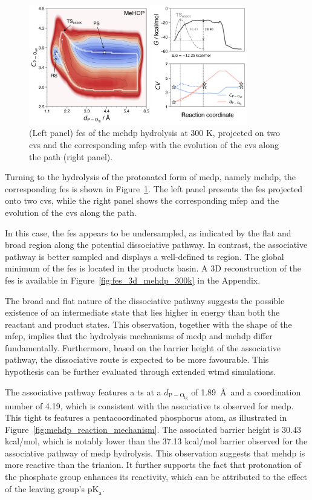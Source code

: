 \begin{figure}[b!]
\centering
\includegraphics[width=0.85\textwidth]{Figures/4_Results/results_MeHDP_300K_fes_mfep.png}
\caption{(Left panel) \ac{fes} of the \ac{mehdp} hydrolysis at 300 K, projected on two \acp{cv} and the corresponding \ac{mfep} with the evolution of the \acp{cv} along the path (right panel).}
\label{fig:mehdp_300k_fes_mfep}
\end{figure}

Turning to the hydrolysis of the protonated form of \ac{medp}, namely \ac{mehdp}, the corresponding \ac{fes} is shown in Figure~\ref{fig:mehdp_300k_fes_mfep}. The left panel presents the \ac{fes} projected onto two \acp{cv}, while the right panel shows the corresponding \ac{mfep} and the evolution of the \acp{cv} along the path.

In this case, the \ac{fes} appears to be undersampled, as indicated by the flat and broad region along the potential dissociative pathway. In contrast, the associative pathway is better sampled and displays a well-defined \ac{ts} region. The global minimum of the \ac{fes} is located in the products basin. A 3D reconstruction of the \ac{fes} is available in Figure~\ref{fig:fes_3d_mehdp_300k} in the Appendix.

The broad and flat nature of the dissociative pathway suggests the possible existence of an intermediate state that lies higher in energy than both the reactant and product states. This observation, together with the shape of the \ac{mfep}, implies that the hydrolysis mechanisms of \ac{medp} and \ac{mehdp} differ fundamentally. Furthermore, based on the barrier height of the associative pathway, the dissociative route is expected to be more favourable. This hypothesis can be further evaluated through extended \ac{wtmd} simulations.

The associative pathway features a \ac{ts} at a $d_\mathrm{P-O_{\mathrm{lg}}}$ of 1.89~\AA\ and a coordination number of 4.19, which is consistent with the associative \ac{ts} observed for \ac{medp}. This tight \ac{ts} features a pentacoordinated phosphorus atom, as illustrated in Figure~\ref{fig:mehdp_reaction_mechanism}. The associated barrier height is 30.43 kcal/mol, which is notably lower than the 37.13 kcal/mol barrier observed for the associative pathway of \ac{medp} hydrolysis. This observation suggests that \ac{mehdp} is more reactive than the trianion. It further supports the fact that protonation of the phosphate group enhances its reactivity, which can be attributed to the effect of the leaving group's $\mathrm{pK}_\mathrm{a}$.


